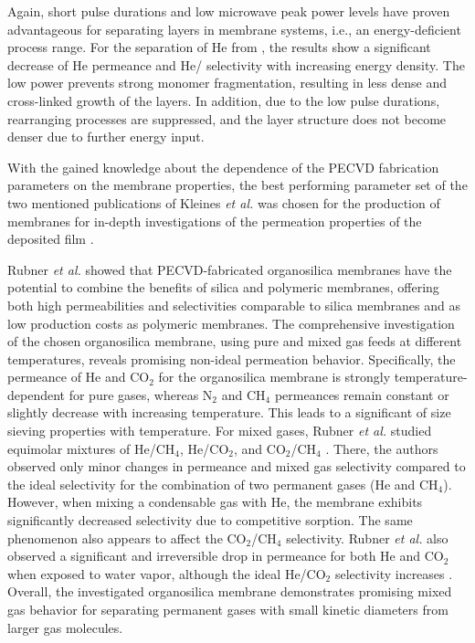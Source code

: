 \documentclass[AMA,STIX2COL]{WileyNJD-v2} %
\begin{document}
Again, short pulse durations and low microwave peak power levels have proven advantageous for separating layers in membrane systems, i.e., an energy-deficient process range. For the separation of He from , the results show a significant decrease of He permeance and He/ selectivity with increasing energy density. The low power prevents strong monomer fragmentation, resulting in less dense and cross-linked growth of the layers. In addition, due to the low pulse durations, rearranging processes are suppressed, and the layer structure does not become denser due to further energy input.\cite{kleines2022evaluation}

With the gained knowledge about the dependence of the PECVD fabrication parameters on the membrane properties, the best performing parameter set of the two mentioned publications of Kleines \textit{et al.} was chosen for the production of membranes for in-depth investigations of the permeation properties of the deposited film \cite{kleines2021structure,kleines2022evaluation}.

Rubner \textit{et al.} \cite{rubner2022mixed} showed that PECVD-fabricated organosilica membranes have the potential to combine the benefits of silica and polymeric membranes, offering both high permeabilities and selectivities comparable to silica membranes and as low production costs as polymeric membranes. The comprehensive investigation of the chosen organosilica membrane, using pure and mixed gas feeds at different temperatures, reveals promising non-ideal permeation behavior. Specifically, the permeance of He and CO$_2$ for the organosilica membrane is strongly temperature-dependent for pure gases, whereas N$_2$ and CH$_4$ permeances remain constant or slightly decrease with increasing temperature. This leads to a significant of size sieving properties with temperature. For mixed gases, Rubner \textit{et al.} studied equimolar mixtures of He/CH$_4$, He/CO$_2$, and CO$_2$/CH$_4$ \cite{rubner2022mixed}. There, the authors observed only minor changes in permeance and mixed gas selectivity compared to the ideal selectivity for the combination of two permanent gases (He and CH$_4$). However, when mixing a condensable gas with He, the membrane exhibits significantly decreased selectivity due to competitive sorption. The same phenomenon also appears to affect the CO$_2$/CH$_4$ selectivity. Rubner \textit{et al.} also observed a significant and irreversible drop in permeance for both He and CO$_2$ when exposed to water vapor, although the ideal He/CO$_2$ selectivity increases \cite{rubner2022mixed}. Overall, the investigated organosilica membrane demonstrates promising mixed gas behavior for separating permanent gases with small kinetic diameters from larger gas molecules.\cite{rubner2022mixed}
\end{document}
